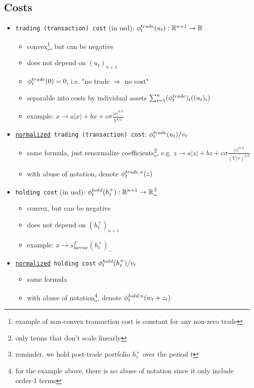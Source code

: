 \subsection{Costs}
\begin{itemize}
	\item \texttt{trading (transaction) cost} (in usd): $\phi^{trade}_t(u_t): \mathbb{R}^{n+1} \to \mathbb{R}$
	\begin{itemize}[label=$\star$]
		\item convex\footnote{example of non-convex transaction cost is constant for any non-zero trade}, but can be negative
		\item does not depend on $(u_t)_{n+1}$
		\item $\phi^{trade}_t(0) = 0$, i.e. "no trade $\Rightarrow$ no cost"
		\item separable into costs by individual assets $\sum_{i=1}^n (\phi^{trade}_t)_i((u_t)_i)$
		\item example: $x \longrightarrow a |x| + b x + c \sigma \frac {|x|^{3/2}}{V^{1/2}}$
	\end{itemize} 
	\item \texttt{\underline{normalized} trading (transaction) cost}: $\phi^{trade}_t(u_t) / v_t$
	\begin{itemize}[label=$\star$]
		\item same formula, just renormalize coefficients\footnote{only terms that don't scale linearly}, e.g. $z \longrightarrow a |z| + b z + c \sigma \frac{|z|^{3/2}}{(V/v)^{3/2}}$
		\item with abuse of notation, denote $\phi^{trade.n}_t(z)$
	\end{itemize}
	\item \texttt{holding cost} (in usd): $\phi^{hold}_t(h_t^+): \mathbb{R}^{n+1} \to \mathbb{R}$\footnote{reminder, we hold post-trade portfolio $h_t^+$ over the period $t$}
	\begin{itemize}[label=$\star$]
		\item convex, but can be negative
		\item does not depend on $(h_t^+)_{n+1}$
		\item example: $x \longrightarrow s_{borrow}^T (h_t^+)_{-}$
	\end{itemize}
	\item \texttt{\underline{normalized} holding cost} $\phi^{hold}_t(h_t^+)/v_t$
	\begin{itemize}[label=$\star$]
		\item same formula
		\item with abuse of notation\footnote{for the example above, there is no abuse of notation since it only include order-1 terms}, denote $\phi^{hold.n}_t(w_t+z_t)$
	\end{itemize}
\end{itemize}

